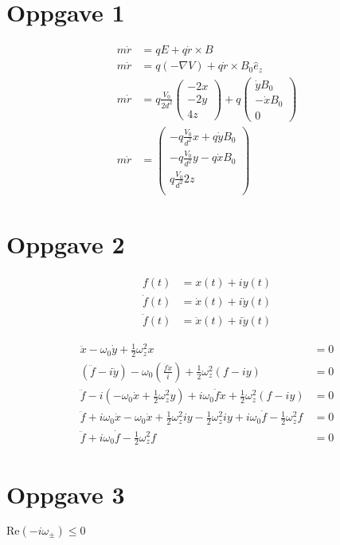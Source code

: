 
\section*{Oppgave 1}
\begin{align}
m \dot r &= qE + q\dot r \times B \\
m \dot r &= q(- \nabla V) + q\dot r \times B_0 \hat{e}_z \\
m \dot r &= q \frac{V_0}{2d^2} \begin{pmatrix} -2x \\ -2y \\ 4z \end{pmatrix}
          + q \begin{pmatrix} \dot y B_0 \\ -\dot x B_0 \\ 0 \end{pmatrix} \\
m \dot r &=
    \begin{pmatrix} 
        - q \frac{V_0}{d^2} x + q \dot y B_0 \\
        - q \frac{V_0}{d^2} y - q \dot x B_0 \\
        q \frac{V_0}{d^2} 2z \\
    \end{pmatrix}
\end{align}

\section*{Oppgave 2}
\begin{align}
f(t) &= x(t) + iy(t) \\
\dot f(t) &= \dot x(t) + i \dot y(t) \\
\ddot f(t) &= \ddot x(t) + i \ddot y(t)
\end{align}

\begin{align}
\ddot x - \omega_0 \dot y + \frac{1}{2} \omega_z^2 x &= 0 \\
\left( \ddot f - i \ddot y \right) - \omega_0 \left( \frac{\dot f \dot x}{i} \right) + \frac{1}{2} \omega_z^2 \left( f - iy \right) &= 0 \\
\ddot f - i \left( - \omega_0 \dot x + \frac{1}{2} \omega_z^2 y \right) + i \omega_0 \dot f \dot x + \frac{1}{2} \omega_z^2 \left( f - iy \right) &= 0 \\
\ddot f + i \omega_0 \dot x - \omega_0 \dot x + \frac{1}{2} \omega_z^2 i y - \frac{1}{2} \omega_z^2 i y + i \omega_0 \dot f - \frac{1}{2} \omega_z^2 f &= 0 \\
\ddot f + i \omega_0 \dot f - \frac{1}{2} \omega_z^2 f &= 0
\end{align}

\section*{Oppgave 3}
$\text{Re}(-i\omega_\pm) \leq 0$

